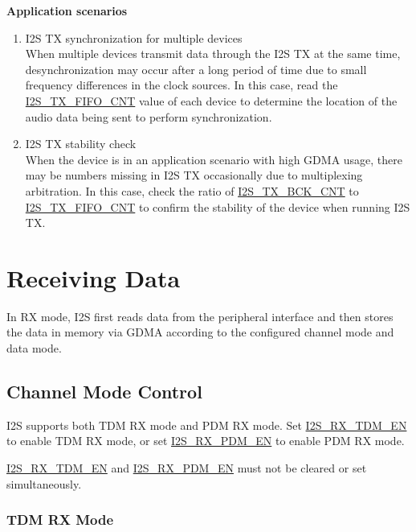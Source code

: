 \documentclass[main\_\_EN.tex]{subfiles}
\begin{document}
\textbf{Application scenarios}
\begin{enumerate}
    \item I2S TX synchronization for multiple devices \\
    When multiple devices transmit data through the I2S TX at the same time, desynchronization may occur after a long period of time due to small frequency differences in the clock sources. In this case, read the \hyperref[fielddesc:I2STXFIFOCNT]{I2S\_TX\_FIFO\_CNT} value of each device to determine the location of the audio data being sent to perform synchronization.
    \item I2S TX stability check\\
    When the device is in an application scenario with high GDMA usage, there may be numbers missing in I2S TX occasionally due to multiplexing arbitration. In this case, check the ratio of \hyperref[fielddesc:I2STXBCKCNT]{I2S\_TX\_BCK\_CNT} to \hyperref[fielddesc:I2STXFIFOCNT]{I2S\_TX\_FIFO\_CNT} to confirm the stability of the device when running I2S TX.
\end{enumerate}


\section{Receiving Data}\label{sec:i2s-rx-data}


In RX mode, I2S first reads data from the peripheral interface and then stores the data in memory via GDMA according to the configured channel mode and data mode.

\subsection{Channel Mode Control}

\chipname{} I2S supports both TDM RX mode and PDM RX mode. Set \hyperref[fielddesc:I2SRXTDMEN]{I2S\_RX\_TDM\_EN} to enable TDM RX mode, or set \hyperref[fielddesc:I2SRXPDMEN]{I2S\_RX\_PDM\_EN} to enable PDM RX mode.

\begin{tiplisting}
\hyperref[fielddesc:I2SRXTDMEN]{I2S\_RX\_TDM\_EN} and \hyperref[fielddesc:I2SRXPDMEN]{I2S\_RX\_PDM\_EN} must not be cleared or set simultaneously.
\end{tiplisting}
\vspace{-1em}

\subsubsection{TDM RX Mode}
\end{document}
